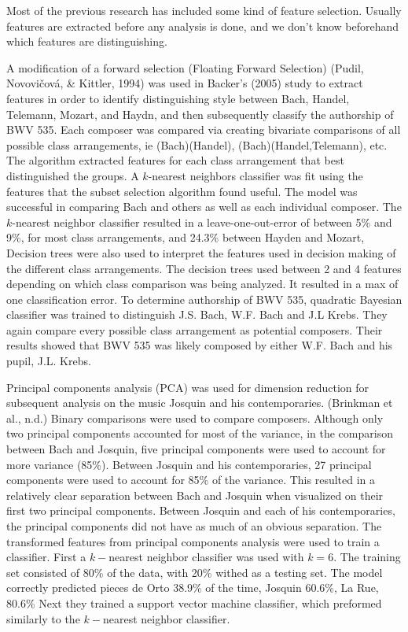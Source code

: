 \documentclass[12pt,twoside]{reedthesis}
\theoremstyle{definition}
\theoremstyle{definition}
\theoremstyle{definition}
\theoremstyle{remark}
\begin{document}
Most of the previous research has included some kind of feature
selection. Usually features are extracted before any analysis is done,
and we don't know beforehand which features are distinguishing.

A modification of a forward selection (Floating Forward Selection)
(Pudil, Novovičová, \& Kittler, 1994) was used in Backer's (2005) study
to extract features in order to identify distinguishing style between
Bach, Handel, Telemann, Mozart, and Haydn, and then subsequently
classify the authorship of BWV 535. Each composer was compared via
creating bivariate comparisons of all possible class arrangements, ie
(Bach)(Handel), (Bach)(Handel,Telemann), etc. The algorithm extracted
features for each class arrangement that best distinguished the groups.
A \(k\)-nearest neighbors classifier was fit using the features that the
subset selection algorithm found useful. The model was successful in
comparing Bach and others as well as each individual composer. The
\(k\)-nearest neighbor classifier resulted in a leave-one-out-error of
between 5\% and 9\%, for most class arrangements, and 24.3\% between
Hayden and Mozart, Decision trees were also used to interpret the
features used in decision making of the different class arrangements.
The decision trees used between 2 and 4 features depending on which
class comparison was being analyzed. It resulted in a max of one
classification error. To determine authorship of BWV 535, quadratic
Bayesian classifier was trained to distinguish J.S. Bach, W.F. Bach and
J.L Krebs. They again compare every possible class arrangement as
potential composers. Their results showed that BWV 535 was likely
composed by either W.F. Bach and his pupil, J.L. Krebs.

Principal components analysis (PCA) was used for dimension reduction for
subsequent analysis on the music Josquin and his contemporaries.
(Brinkman et al., n.d.) Binary comparisons were used to compare
composers. Although only two principal components accounted for most of
the variance, in the comparison between Bach and Josquin, five principal
components were used to account for more variance (85\%). Between
Josquin and his contemporaries, 27 principal components were used to
account for 85\% of the variance. This resulted in a relatively clear
separation between Bach and Josquin when visualized on their first two
principal components. Between Josquin and each of his contemporaries,
the principal components did not have as much of an obvious separation.
The transformed features from principal components analysis were used to
train a classifier. First a \(k-\)nearest neighbor classifier was used
with \(k = 6\). The training set consisted of 80\% of the data, with
20\% withed as a testing set. The model correctly predicted pieces de
Orto 38.9\% of the time, Josquin 60.6\%, La Rue, 80.6\% Next they
trained a support vector machine classifier, which preformed similarly
to the \(k-\)nearest neighbor classifier.
\end{document}
